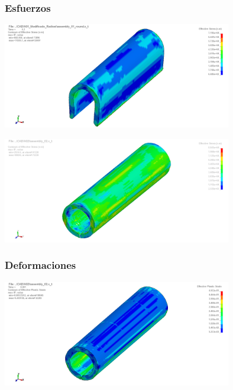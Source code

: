 \subsubsection{Esfuerzos}


\begin{center}
\includegraphics[width=0.75\textwidth]{src/ch4/von_mises_3D_01.png}
\label{fig:von_mises_3D_01}
\end{center}

\begin{center}
\includegraphics[width=0.75\textwidth]{src/ch4/von_mises_3D_02.png}
\label{fig:von_mises_3D_02}
\end{center}

\subsubsection{Deformaciones}

\begin{center}
\includegraphics[width=0.75\textwidth]{src/ch4/eqv_strain_01.png}
\label{fig:eqv_strain_01}
\end{center}


